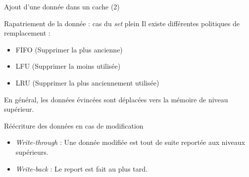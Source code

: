 \begin{frame}{Ajout d'une donnée dans un cache (2)}
  \begin{block}{Rapatriement de la donnée : cas du \emph{set} plein}
    Il existe différentes politiques de remplacement :
    \begin{itemize}
    \item{FIFO (Supprimer la plus ancienne)}
    \item{LFU (Supprimer la moins utilisée)}
    \item{LRU (Supprimer la plus anciennement utilisée)}
    \end{itemize}
    En général, les données évincées sont déplacées vers la mémoire de niveau supérieur.
  \end{block}
  \begin{block}{Réécriture des données en cas de modification}
    \begin{itemize}
    \item{\emph{Write-through} : Une donnée modifiée est tout de suite reportée aux niveaux supérieurs.}
    \item{\emph{Write-back} : Le report est fait au plus tard.}
    \end{itemize}
  \end{block}

\end{frame}
